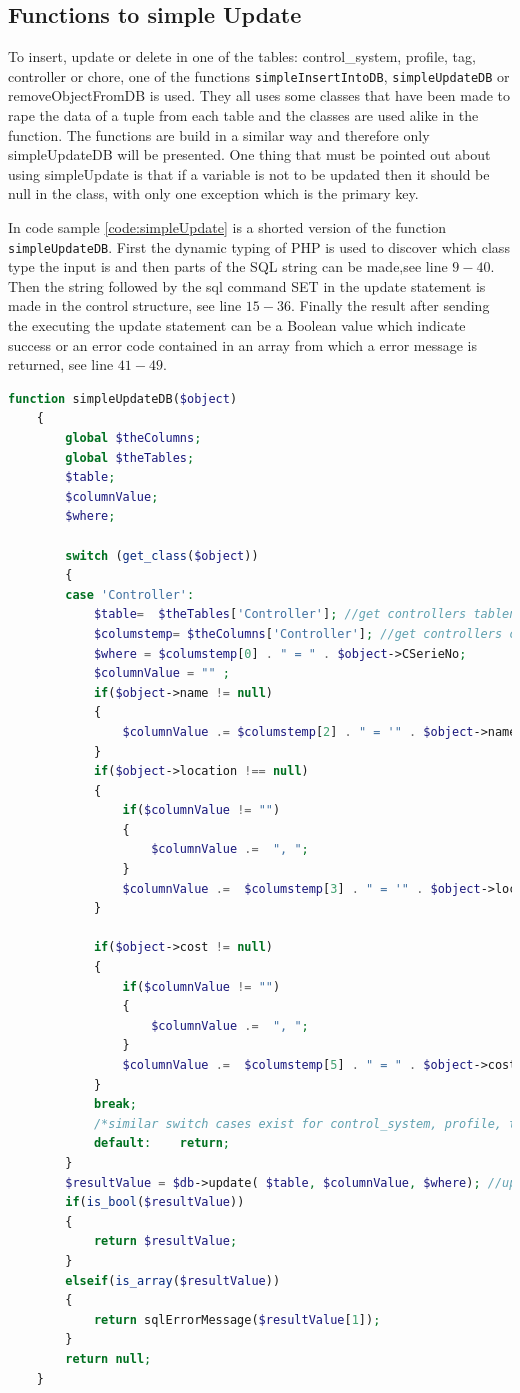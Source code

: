 \subsection{Functions to simple Update}
To insert, update or delete in one of the tables: control\_system, profile, tag, controller or chore, one of the functions \texttt{simpleInsertIntoDB}, \texttt{simpleUpdateDB} or removeObjectFromDB is used. They all uses some classes that have been made to rape the data of a tuple from each table and the classes are used alike in the function. The functions are build in a similar way and therefore only simpleUpdateDB will be presented. One thing that must be pointed out about using simpleUpdate is that if a variable is not to be updated then it should be null in the class, with only one exception which is the primary key. 

In code sample \ref{code:simpleUpdate} is a shorted version of the function \texttt{simpleUpdateDB}.  
First the dynamic typing of PHP is used to discover which class type the input is and then parts of the SQL string can be made,see line $9-40$. Then the string followed by the sql command SET in the update statement is made in the control structure, see line $15-36$. 
Finally the result after sending the executing the update statement can be a Boolean value which indicate success or an error code contained in an array from which a error message is returned, see line $41-49$.

\begin{lstlisting}[language=PHP, label=code:simpleUpdate, caption=simpleUpdateDB code sample]
function simpleUpdateDB($object)
	{
		global $theColumns;
		global $theTables;
		$table;
		$columnValue;
		$where;

		switch (get_class($object))
		{ 		
		case 'Controller':
			$table=  $theTables['Controller']; //get controllers tablename
			$columstemp= $theColumns['Controller']; //get controllers columns in array
			$where = $columstemp[0] . " = " . $object->CSerieNo;
			$columnValue = "" ;
			if($object->name != null)
			{
				$columnValue .= $columstemp[2] . " = '" . $object->name . "'";
			}
			if($object->location !== null) 
			{
				if($columnValue != "")
				{
					$columnValue .=  ", ";
				}
				$columnValue .=  $columstemp[3] . " = '" . $object->location . "'";
			}
			
			if($object->cost != null)
			{
				if($columnValue != "")
				{
					$columnValue .=  ", ";
				}
				$columnValue .=  $columstemp[5] . " = " . $object->cost;
			}
			break;
			/*similar switch cases exist for control_system, profile, tag, controller or chore*/
			default: 	return;
		}
		$resultValue = $db->update( $table, $columnValue, $where); //update the 
		if(is_bool($resultValue))
		{ 
			return $resultValue;
		}
		elseif(is_array($resultValue))
		{
			return sqlErrorMessage($resultValue[1]);
		}
		return null;
	}	
\end{lstlisting}


